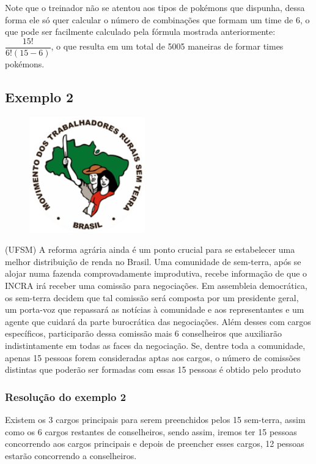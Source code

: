 Note que o treinador não se atentou aos tipos de pokémons que dispunha, dessa forma ele só quer calcular o número de combinações que formam um time de 6, o que pode ser facilmente calculado pela fórmula mostrada anteriormente: $\dfrac{15!}{6!(15-6)}$, o que resulta em um total de 5005 maneiras de formar times pokémons.

\subsection*{Exemplo 2}

\begin{figure}
	\includegraphics[width=5cm, left]{imagens/mst.png}
\end{figure}

(UFSM) A reforma agrária ainda é um ponto crucial para se estabelecer uma melhor distribuição de renda no Brasil. Uma comunidade de sem-terra, após se alojar numa fazenda comprovadamente improdutiva, recebe informação de que o INCRA irá receber uma comissão para negociações. Em assembleia democrática, os sem-terra decidem que tal comissão será composta por um presidente geral, um porta-voz que repassará as notícias à comunidade e aos representantes e um agente que cuidará da parte burocrática das negociações. Além desses com cargos específicos, participarão dessa comissão mais 6 conselheiros que auxiliarão indistintamente em todas as faces da negociação.
Se, dentre toda a comunidade, apenas 15 pessoas forem consideradas aptas aos cargos, o número de comissões distintas que poderão ser formadas com essas 15 pessoas é obtido pelo produto

\subsubsection*{Resolução do exemplo 2}

Existem os 3 cargos principais para serem preenchidos pelos 15 sem-terra, assim como os 6 cargos restantes de conselheiros, sendo assim, iremos ter 15 pessoas concorrendo aos cargos principais e depois de preencher esses cargos, 12 pessoas estarão concorrendo a conselheiros.

